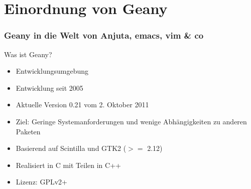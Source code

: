 \section[Einordnung]{Einordnung von Geany}
\begin{frame}
	\frametitle{Geany in die Welt von Anjuta, emacs, vim \& co}
	\begin{block}{Was ist Geany?}
		\begin{itemize}
			\item Entwicklungsumgebung
			\item Entwicklung seit 2005
			\item Aktuelle Version 0.21 vom 2. Oktober 2011
			\item Ziel: Geringe Systemanforderungen und wenige
				  Abhängigkeiten zu anderen Paketen
			\item Basierend auf Scintilla und GTK2 ($>=$ 2.12)
			\item Realisiert in C mit Teilen in C++
			\item Lizenz: GPLv2+
		\end{itemize}
	\end{block}
\end{frame}
